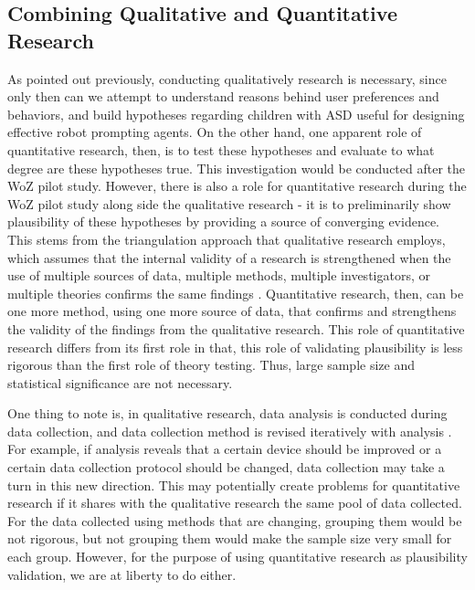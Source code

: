 \subsection{Combining Qualitative and Quantitative Research}
As pointed out previously, conducting qualitatively research is necessary, since only then can we attempt to understand reasons behind user preferences and behaviors, and build hypotheses regarding children with ASD useful for designing effective robot prompting agents.  On the other hand, one apparent role of quantitative research, then, is to test these hypotheses and evaluate to what degree are these hypotheses true.  This investigation would be conducted after the WoZ pilot study.  However, there is also a role for quantitative research during the WoZ pilot study along side the qualitative research - it is to preliminarily show plausibility of these hypotheses by providing a source of converging evidence.  This stems from the triangulation approach that qualitative research employs, which assumes that the internal validity of a research is strengthened when the use of multiple sources of data, multiple methods, multiple investigators, or multiple theories confirms the same findings \cite{merriam2014qualitative}.  Quantitative research, then, can be one more method, using one more source of data, that confirms and strengthens the validity of the findings from the qualitative research.  This role of quantitative research differs from its first role in that, this role of validating plausibility is less rigorous than the first role of theory testing.  Thus, large sample size and statistical significance are not necessary.

One thing to note is, in qualitative research, data analysis is conducted during data collection, and data collection method is revised iteratively with analysis \cite{merriam2014qualitative}.  For example, if analysis reveals that a certain device should be improved or a certain data collection protocol should be changed, data collection may take a turn in this new direction.  This may potentially create problems for quantitative research if it shares with the qualitative research the same pool of data collected.  For the data collected using methods that are changing, grouping them would be not rigorous, but not grouping them would make the sample size very small for each group.  However, for the purpose of using quantitative research as plausibility validation, we are at liberty to do either.

